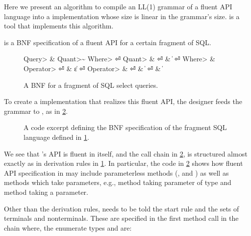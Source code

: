 Here we present an algorithm to compile an LL(1) grammar of a fluent API
language into a \Java implementation whose size is linear in the grammar's
size. \Fajita is a \Java tool that implements this algorithm.

 is a BNF specification of a fluent API for a certain
fragment of SQL.

\begin{figure}[H]
  \caption{\label{figure:sql-bnf}
    A BNF for a fragment of SQL select queries.
  }
  \begin{Grammar}
    \begin{aligned}
      \<Query>    & \Derives {} \<Quant>\~ \<Where> \hfill⏎
      \<Quant>    & \Derives {} \hfill⏎
                  & \|  \hfill⏎
      \<Where>    & \Derives {}  \<Operator> \hfill⏎
                  & \|ε \hfill⏎
      \<Operator> & \Derives {}\hfill⏎
                  & \|  \hfill⏎
                  & \| \hfill
    \end{aligned}
  \end{Grammar}
\end{figure}

To create a \Java implementation that realizes this fluent API,
  the designer feeds the grammar to \Fajita, as in  
  \cref{figure:sql-bnf-java}.

\begin{figure}[H]
  \caption{\label{figure:sql-bnf-java}
    A \Java code excerpt defining the BNF specification of the fragment SQL
    language defined in \cref{figure:sql-bnf}.}
\end{figure}

We see that \Fajita's API is fluent in itself, and the 
  call chain in \cref{figure:sql-bnf-java}, is structured almost
  exactly as in derivation rules in \cref{figure:sql-bnf}.
In particular, the code in \cref{figure:sql-bnf-java} shows how fluent API specification in \Fajita
  may include parameterless methods (,  and ) as well as methods which 
  take parameters, e.g., method  taking parameter of type  and 
    method  taking a  parameter.

Other than the derivation rules, \Fajita  needs to be told the start rule
  and the sets of terminals and nonterminals.
These are specified in the first method call in the chain where, 
  the enumerate types  and  are:

